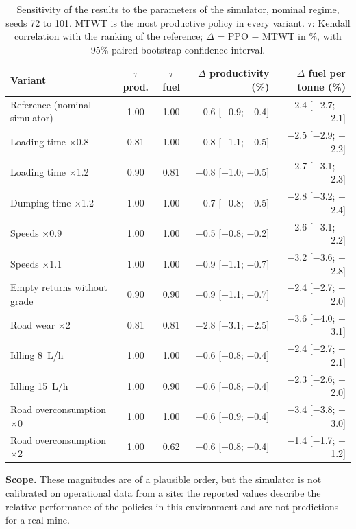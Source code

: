\documentclass[11pt,a4paper]{article}
\newif\ifcorrmarks
\newenvironment{corrbloc}{\par\ifcorrmarks\color{corrcolor}\fi}{\par}
\begin{document}
\begin{corrbloc}
\begin{table}[H]
\centering
\caption{Sensitivity of the results to the parameters of the simulator, nominal regime, seeds 72 to 101. MTWT is the most productive policy in every variant. $\tau$: Kendall correlation with the ranking of the reference; $\Delta$ = PPO $-$ MTWT in \%, with 95\% paired bootstrap confidence interval.}
\label{tab:sensitivity}
\small
\setlength{\tabcolsep}{5pt}
\begin{tabular}{@{}lccrr@{}}
\toprule
\textbf{Variant} & \textbf{$\tau$ prod.} & \textbf{$\tau$ fuel} & \textbf{$\Delta$ productivity (\%)} & \textbf{$\Delta$ fuel per tonne (\%)} \\
\midrule
Reference (nominal simulator) & 1.00 & 1.00 & $-$0.6 [$-$0.9; $-$0.4] & $-$2.4 [$-$2.7; $-$2.1] \\
\midrule
Loading time $\times$0.8 & 0.81 & 1.00 & $-$0.8 [$-$1.1; $-$0.5] & $-$2.5 [$-$2.9; $-$2.2] \\
Loading time $\times$1.2 & 0.90 & 0.81 & $-$0.8 [$-$1.0; $-$0.5] & $-$2.7 [$-$3.1; $-$2.3] \\
Dumping time $\times$1.2 & 1.00 & 1.00 & $-$0.7 [$-$0.8; $-$0.5] & $-$2.8 [$-$3.2; $-$2.4] \\
Speeds $\times$0.9 & 1.00 & 1.00 & $-$0.5 [$-$0.8; $-$0.2] & $-$2.6 [$-$3.1; $-$2.2] \\
Speeds $\times$1.1 & 1.00 & 1.00 & $-$0.9 [$-$1.1; $-$0.7] & $-$3.2 [$-$3.6; $-$2.8] \\
Empty returns without grade & 0.90 & 0.90 & $-$0.9 [$-$1.1; $-$0.7] & $-$2.4 [$-$2.7; $-$2.0] \\
Road wear $\times$2 & 0.81 & 0.81 & $-$2.8 [$-$3.1; $-$2.5] & $-$3.6 [$-$4.0; $-$3.1] \\
Idling 8~L/h & 1.00 & 1.00 & $-$0.6 [$-$0.8; $-$0.4] & $-$2.4 [$-$2.7; $-$2.1] \\
Idling 15~L/h & 1.00 & 0.90 & $-$0.6 [$-$0.8; $-$0.4] & $-$2.3 [$-$2.6; $-$2.0] \\
Road overconsumption $\times$0 & 1.00 & 1.00 & $-$0.6 [$-$0.9; $-$0.4] & $-$3.4 [$-$3.8; $-$3.0] \\
Road overconsumption $\times$2 & 1.00 & 0.62 & $-$0.6 [$-$0.8; $-$0.4] & $-$1.4 [$-$1.7; $-$1.2] \\
\bottomrule
\end{tabular}
\end{table}

\textbf{Scope.} These magnitudes are of a plausible order, but the simulator is not calibrated on operational data from a site: the reported values describe the relative performance of the policies in this environment and are not predictions for a real mine.
\end{corrbloc}
\end{document}
